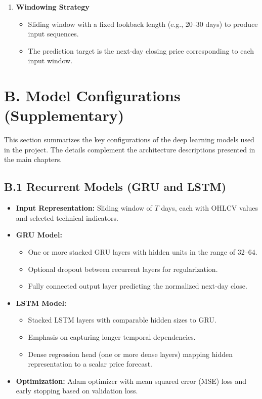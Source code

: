 \begin{enumerate}
    \item \textbf{Windowing Strategy}
    \begin{itemize}
        \item Sliding window with a fixed lookback length (e.g., 20--30 days) to produce input sequences.
        \item The prediction target is the next-day closing price corresponding to each input window.
    \end{itemize}
\end{enumerate}

\newpage

\section*{B. Model Configurations (Supplementary)}

This section summarizes the key configurations of the deep learning models used in the project. The details complement the architecture descriptions presented in the main chapters.

\subsection*{B.1 Recurrent Models (GRU and LSTM)}

\begin{itemize}
    \item \textbf{Input Representation:} Sliding window of $T$ days, each with OHLCV values and selected technical indicators.
    \item \textbf{GRU Model:}
    \begin{itemize}
        \item One or more stacked GRU layers with hidden units in the range of 32--64.
        \item Optional dropout between recurrent layers for regularization.
        \item Fully connected output layer predicting the normalized next-day close.
    \end{itemize}
    \item \textbf{LSTM Model:}
    \begin{itemize}
        \item Stacked LSTM layers with comparable hidden sizes to GRU.
        \item Emphasis on capturing longer temporal dependencies.
        \item Dense regression head (one or more dense layers) mapping hidden representation to a scalar price forecast.
    \end{itemize}
    \item \textbf{Optimization:} Adam optimizer with mean squared error (MSE) loss and early stopping based on validation loss.
\end{itemize}


